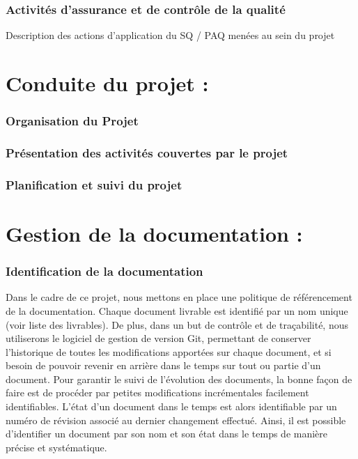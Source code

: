 \documentclass[a4paper, 18pt]{article}
\begin{document}
\section{Activités d'assurance et de contrôle de la qualité }

Description des actions d'application du SQ / PAQ menées au sein du projet 

\part{Conduite du projet : }

\section{Organisation du Projet }

\section{Présentation des activités couvertes par le projet }

\section{Planification et suivi du projet }

\part{Gestion de la documentation :}

\section{Identification de la documentation}

Dans le cadre de ce projet, nous mettons en place une politique de référencement de la documentation. Chaque document
livrable est identifié par un nom unique (voir liste des livrables). De plus, dans un but de contrôle
et de traçabilité, nous utiliserons le logiciel de gestion de version Git, permettant de conserver l'historique de toutes
les modifications apportées sur chaque document, et si besoin de pouvoir revenir en arrière dans le temps sur tout ou
partie d'un document. Pour garantir le suivi de l'évolution des documents, la bonne façon de faire est de procéder par petites
modifications incrémentales facilement identifiables. L'état d'un document dans le temps est alors identifiable par un
numéro de révision associé au dernier changement effectué. Ainsi, il est possible d'identifier un document par son nom
et son état dans le temps de manière précise et systématique.
\end{document}
